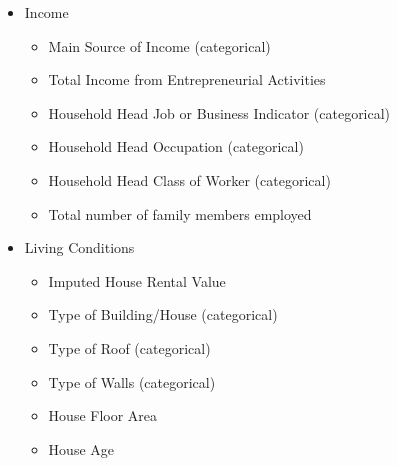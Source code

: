 \documentclass{article}
\begin{document}
\begin{itemize}
\begin{multicols}{2}
\begin{itemize}
        \item Alcoholic Beverages Expenditure
        \item Tobacco Expenditure
        \item Clothing, Footwear and Other Wear Expenditure
        \item Housing and water Expenditure
        \item Medical Care Expenditure
        \item Transportation Expenditure
        \item Communication Expenditure
        \item Education Expenditure
        \item Miscellaneous Goods and Services Expenditure
        \item Special Occasions Expenditure
        \item Crop Farming and Gardening expenses
      \end{itemize}
    \end{multicols}
  \item Income
    \begin{multicols}{2}
      \begin{itemize}
        \item Main Source of Income (categorical)
        \item Total Income from Entrepreneurial Activities
        \item Household Head Job or Business Indicator (categorical)
        \item Household Head Occupation (categorical)
        \item Household Head Class of Worker (categorical)
        \item Total number of family members employed
      \end{itemize}
    \end{multicols}
  \item Living Conditions
    \begin{multicols}{2}
      \begin{itemize}
        \item Imputed House Rental Value
        \item Type of Building/House (categorical)
        \item Type of Roof (categorical)
        \item Type of Walls (categorical)
        \item House Floor Area
        \item House Age

\end{itemize}
\end{multicols}
\end{itemize}
\end{document}
